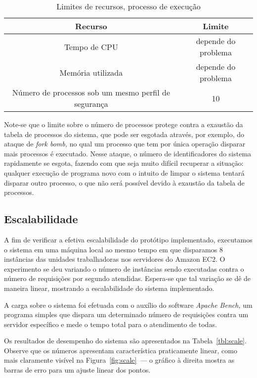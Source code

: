 \documentclass[ruledheader, 12pt]{abnt}
\newcommand{\tblref}[1]{Tabela~\ref{tbl:#1}}
\begin{document}
\begin{table}[h]
	\centering
	\caption{\label{tbl:execution-limits}Limites de recursos, processo de execução}
	\begin{tabular}{c c}\hline
		\hline
		Recurso & Limite \\\hline
		\hline
		Tempo de CPU & depende do problema \\\hline
		Memória utilizada & depende do problema \\\hline
		Número de processos sob um mesmo perfil de segurança & 10 \\\hline
		\hline
	\end{tabular}
\end{table}

Note-se que o limite sobre o número de processos protege contra a exaustão da tabela de processos do sistema, que pode ser esgotada através, por exemplo, do ataque de \emph{fork bomb,} no qual um processo que tem por única operação disparar mais processos é executado. Nesse ataque, o número de identificadores do sistema rapidamente se esgota, fazendo com que seja muito difícil recuperar a situação: qualquer execução de programa novo com o intuito de limpar o sistema tentará disparar outro processo, o que não será possível devido à exaustão da tabela de processos.

\subsection{Escalabilidade}

A fim de verificar a efetiva escalabilidade do protótipo implementado, executamos o sistema em uma máquina local ao mesmo tempo em que disparamos 8 instâncias das unidades trabalhadoras nos servidores do Amazon EC2. O experimento se deu variando o número de instâncias sendo executadas contra o número de requisições por segundo atendidas. Espera-se que tal variação se dê de maneira linear, mostrando a escalabilidade do sistema implementado.

A carga sobre o sistema foi efetuada com o auxílio do software \emph{Apache Bench,} um programa simples que dispara um determinado número de requisições contra um servidor específico e mede o tempo total para o atendimento de todas.

Os resultados de desempenho do sistema são apresentados na \tblref{scale}. Observe que os números apresentam característica praticamente linear, como mais claramente visível na Figura~\ref{fig:scale}~--- o gráfico à direita mostra as barras de erro para um ajuste linear dos pontos.
\end{document}

